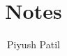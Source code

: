\documentclass{article}
\begin{document}
\title{Notes}
\author{Piyush Patil}
\maketitle
\end{document}
